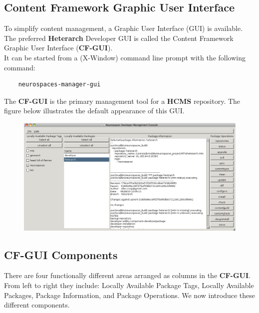 \documentclass[12pt]{article}
\begin{document}
\subsection*{Content Framework Graphic User Interface}

To simplify content management, a Graphic User Interface (GUI) is available.\\
The preferred {\bf \small Heterarch} Developer GUI is called the Content Framework Graphic User Interface ({\small \bf CF-GUI}).\\
\noindent It can be started from a (X-Window) command line prompt with the following command:

\begin{verbatim}
	neurospaces-manager-gui
\end{verbatim}

\noindent The {\small \bf CF-GUI} is the primary management tool for a {\bf \small HCMS} repository. The figure below illustrates the default appearance of this GUI.

\begin{figure}[h]
   \centering
   \includegraphics[scale=0.4]{figures/neurospaces-developer-management-console.eps}
\end{figure}

\subsection*{CF-GUI Components}

There are four functionally different areas arranged as columns in the {\small \bf CF-GUI}. From left to right they include: Locally Available Package Tags, Locally Available Packages, Package Information, and Package Operations.
We now introduce these different components.
\end{document}
